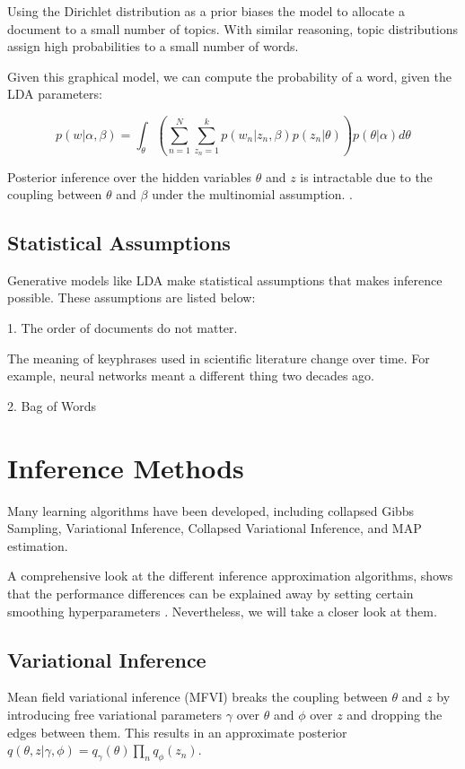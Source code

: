 \documentclass[letterpaper]{article}
\begin{document}
Using the Dirichlet distribution as a prior biases the model to
allocate a document to a small number of topics. With similar
reasoning, topic distributions assign high probabilities to a small
number of words.

Given this graphical model, we can compute the probability of a word,
given the LDA parameters:

\begin{equation}
  p(w | \alpha, \beta) = \int_\theta \left( \sum_{n=1}^{N}
    \sum_{z_n = 1}^{k} p(w_n | z_n, \beta)p(z_n | \theta) \right)
  p(\theta | \alpha) d\theta
\end{equation}

Posterior inference over the hidden variables $\theta$ and $z$ is
intractable due to the coupling between $\theta$ and $\beta$ under the
multinomial assumption. \citep{blei2003latent}.

\subsection{Statistical Assumptions}
\label{subsec:label}
Generative models like LDA make statistical assumptions that makes
inference possible. These assumptions are listed below:

1. The order of documents do not matter.

The meaning of keyphrases used in scientific literature change over
time. For example, neural networks meant a different thing two decades
ago.

2. Bag of Words

\section{Inference Methods}
\label{sec:inference}
Many learning algorithms have been developed, including collapsed
Gibbs Sampling, Variational Inference, Collapsed Variational
Inference, and MAP estimation.

A comprehensive look at the different inference approximation
algorithms, shows that the performance differences can be explained
away by setting certain smoothing hyperparameters
\citep{asuncion-2012-smoot-infer}. Nevertheless, we will take a closer
look at them.

\subsection{Variational Inference}
\label{subsec:variational_inference}
Mean field variational inference (MFVI) breaks the coupling between
$\theta$ and $z$ by introducing free variational parameters $\gamma$
over $\theta$ and $\phi$ over $z$ and dropping the edges between them.
This results in an approximate posterior $q(\theta, z | \gamma, \phi)
= q_\gamma(\theta)\prod_nq_\phi(z_n)$.
\end{document}

